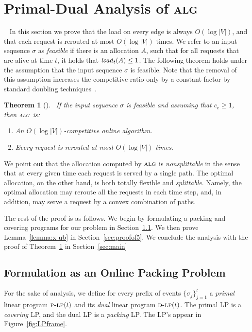 \documentclass[11pt]{article}
\newenvironment{proof sketch}[1]{\noindent {\emph{Proof sketch of #1:}}}{\hfill \qed}
\newtheorem{theorem}{Theorem}
\newcommand{\dlp}{\textsc{d-lp}}
\newcommand{\plp}{\textsc{p-lp}}
\newcommand{\alg}{\textsc{alg}}
\newcommand{\event}{\text{$\sigma$}}
\newcommand{\load}{\text{\textit{load}}}
\begin{document}
\section{Primal-Dual Analysis of \alg}~\label{sec:analysis} In this section we prove that the load on
every edge is always $O(\log |V|)$, and that each request is rerouted
at most $O(\log |V|)$ times.  We refer to an input sequence $\event$
as \emph{feasible} if there is an allocation $A$, such that for all
requests that are alive at time $t$, it holds that $\load_t(A) \leq
1$.  The following theorem holds under the assumption that the input
sequence $\event$ is feasible. Note that the removal of this
assumption increases the competitive ratio only by a constant factor
by standard doubling techniques~\cite{awerbuch2001competitive}.

\begin{theorem}[\cite{awerbuch2001competitive}]~\label{thm:main result}
If the input sequence $\event$ is feasible and assuming that $c_e \geq 1$, then \alg\ is:
 \begin{enumerate}
   \item An $O(\log |V|)$-competitive online algorithm.
   \item Every request is rerouted at most $O(\log |V|)$ times.
 \end{enumerate}
\end{theorem}

We point out that the allocation computed by $\alg$ is
\emph{nonsplittable} in the sense that at every given time each
request is served by a single path.  The optimal allocation, on the
other hand, is both totally
flexible and \emph{splittable}. Namely, the optimal allocation may reroute all
the requests in each time step, and, in addition, may serve a request
by a convex combination of paths.


\medskip \noindent
The rest of the proof is as follows.
We begin by formulating a packing and covering programs for our problem in Section~\ref{sec:lp}.
We then prove Lemma~\ref{lemma:x ub} in Section~\ref{sec:proofof5}.
We conclude the analysis with the proof of Theorem~\ref{thm:main result} in Section~\ref{sec:main}
\subsection{Formulation as an Online Packing Problem}\label{sec:lp}
For the sake of analysis, we define for every prefix of events $\{\event_j\}_{j=1}^t$ a \emph{primal} linear program $\plp(t)$ and its \emph{dual} linear program $\dlp(t)$. The primal LP is a \emph{covering} LP, and the dual LP is a \emph{packing} LP.
The LP's appear in Figure~\ref{fig:LPframe}.
\end{document}
